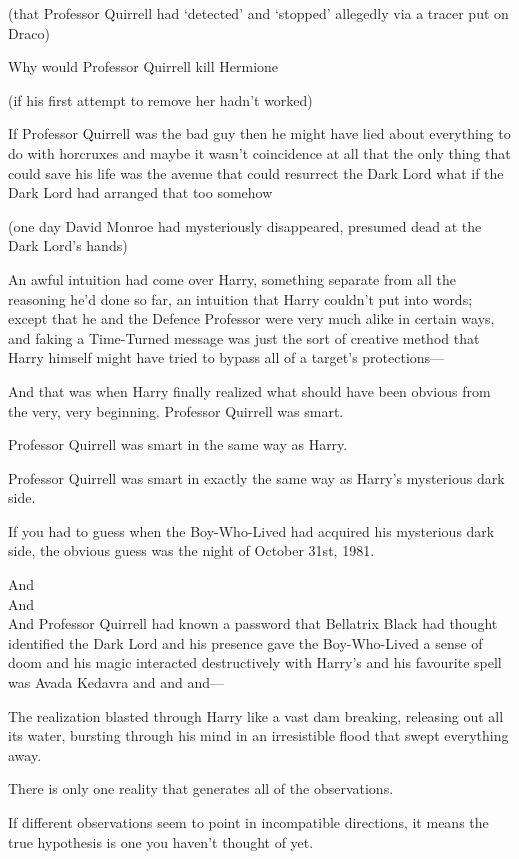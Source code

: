 (that Professor Quirrell had ‘detected’ and ‘stopped’ allegedly via a tracer put on Draco)

Why would Professor Quirrell kill Hermione

(if his first attempt to remove her hadn’t worked)

If Professor Quirrell was the bad guy then he might have lied about everything to do with horcruxes and maybe it wasn’t coincidence at all that the only thing that could save his life was the avenue that could resurrect the Dark Lord what if the Dark Lord had arranged that too somehow

(one day David Monroe had mysteriously disappeared, presumed dead at the Dark Lord’s hands)

An awful intuition had come over Harry, something separate from all the reasoning he’d done so far, an intuition that Harry couldn’t put into words; except that he and the Defence Professor were very much alike in certain ways, and faking a Time-Turned message was just the sort of creative method that Harry himself might have tried to bypass all of a target’s protections—

And that was when Harry finally realized what should have been obvious from the very, very beginning. \later Professor Quirrell was smart.

Professor Quirrell was smart in the same way as Harry.

Professor Quirrell was smart in exactly the same way as Harry’s mysterious dark side.

If you had to guess when the Boy-Who-Lived had acquired his mysterious dark side, the obvious guess was the night of October 31st, 1981.

\later

And\\
And\\
And Professor Quirrell had known a password that Bellatrix Black had thought identified the Dark Lord and his presence gave the Boy-Who-Lived a sense of doom and his magic interacted destructively with Harry’s and his favourite spell was Avada Kedavra and and and—

The realization blasted through Harry like a vast dam breaking, releasing out all its water, bursting through his mind in an irresistible flood that swept everything away.

There is only one reality that generates all of the observations.

If different observations seem to point in incompatible directions, it means the true hypothesis is one you haven’t thought of yet.

